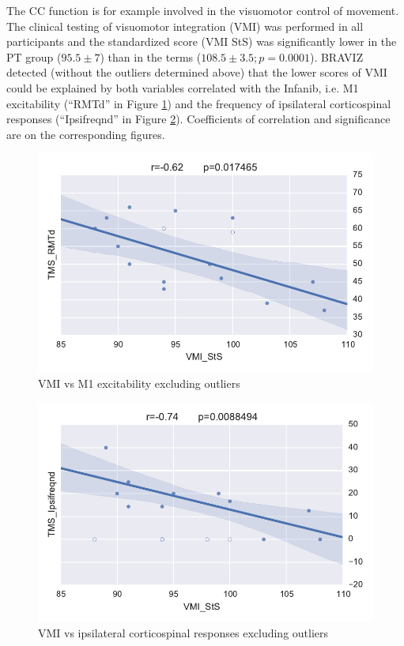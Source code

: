 \documentclass[twocolumn]{svjour3}
\begin{document}


The CC function is for example involved in the visuomotor control of movement. The clinical testing of visuomotor integration (VMI) was performed in all participants and the standardized score (VMI StS) was significantly lower in the PT group ($95.5 \pm 7$) than in the terms ($108.5 \pm 3.5 ; p=0.0001$). 
BRAVIZ detected (without the outliers determined above) that the lower scores of VMI could be explained by both variables correlated with the Infanib, i.e. M1 excitability (``RMTd'' in Figure \ref{fig_cyril_4}) and the frequency of ipsilateral corticospinal responses (``Ipsifreqnd'' in Figure \ref{fig_cyril_5}). Coefficients of correlation and significance are on the corresponding figures.

\begin{figure}
	\centering
		\includegraphics[width=0.9\linewidth]{cyricl_corr_1}
	\caption{VMI vs M1 excitability excluding outliers}
	\label{fig_cyril_4}
\end{figure}

\begin{figure}
	\centering
		\includegraphics[width=0.9\linewidth]{corr_cyril_2}
	\caption{VMI vs ipsilateral corticospinal responses excluding outliers}
	\label{fig_cyril_5}
\end{figure}
\end{document}
